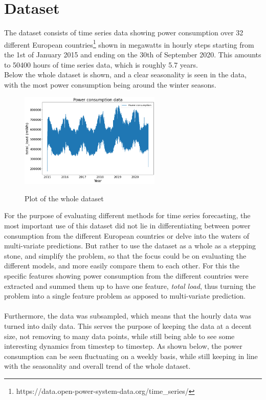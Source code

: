 \documentclass[main.tex]{subfiles}
\begin{document}
\section{Dataset}
The dataset consists of time series data showing power consumption over 32 different European countries\footnote{https://data.open-power-system-data.org/time\_series/} shown in megawatts in hourly steps starting from the 1st of January 2015 and ending on the 30th of September 2020. This amounts to 50400 hours of time series data, which is roughly 5.7 years. \\
Below the whole dataset is shown, and a clear seasonality is seen in the data, with the most power consumption being around the winter seasons.
\begin{figure}[H]
\centering
\includegraphics[width=0.6\textwidth]{GeneralPlots/powerdata.png}
\label{fig:fulldataplot}
\caption{Plot of the whole dataset}
\end{figure}
For the purpose of evaluating different methods for time series forecasting, the most important use of this dataset did not lie in differentiating between power consumption from the different European countries or delve into the waters of multi-variate predictions. But rather to use the dataset as a whole as a stepping stone, and simplify the problem, so that the focus could be on evaluating the different models, and more easily compare them to each other. For this the specific features showing power consumption from the different countries were extracted and summed them up to have one feature, \textit{total load}, thus turning the problem into a single feature problem as apposed to multi-variate prediction.\\
\\
Furthermore, the data was subsampled, which means that the hourly data was turned into daily data. This serves the purpose of keeping the data at a decent size, not removing to many data points, while still being able to see some interesting dynamics from timestep to timestep. As shown below, the power consumption can be seen fluctuating on a weekly basis, while still keeping in line with the seasonality and overall trend of the whole dataset. 
\end{document}
